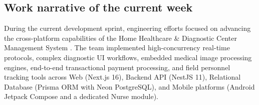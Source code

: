 \documentclass[onecolumn,journal]{IEEEtran}
\begin{document}
	\subsection{Work narrative of the current week}
	
	During the current development sprint, engineering efforts focused on advancing the cross-platform capabilities of the Home Healthcare \& Diagnostic Center Management System \cite{srs2026}. The team implemented high-concurrency real-time protocols, complex diagnostic UI workflows, embedded medical image processing engines, end-to-end transactional payment processing, and field personnel tracking tools across Web (Next.js 16), Backend API (NestJS 11), Relational Database (Prisma ORM with Neon PostgreSQL), and Mobile platforms (Android Jetpack Compose and a dedicated Nurse module).
	
\end{document}
